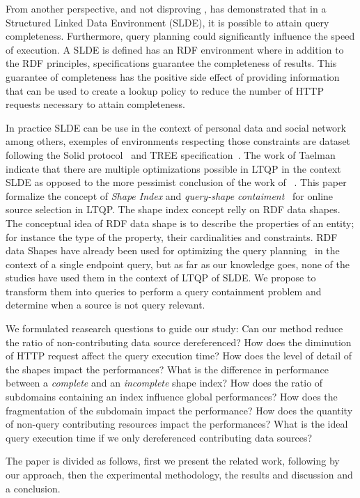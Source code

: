 From another perspective, and not disproving \citeauthor{hartig2016walking}, \citeauthor{Taelman2023} has demonstrated that in a Structured Linked Data Environment (SLDE),
it is possible to attain query completeness.
Furthermore, query planning could significantly influence the speed of execution.
A SLDE is defined has an RDF environment where in addition to the RDF principles, specifications
guarantee the completeness of results.
This guarantee of completeness has the positive side effect of providing information
that can be used to create a lookup policy to reduce the number of HTTP requests necessary to attain completeness.

In practice SLDE can be use in the context of personal data and social network among others,
exemples of environments respecting those constraints are dataset following the Solid protocol~\cite{Taelman2023} and TREE specification~\cite{tam_iswc_traversalsensortree_2024}.
The work of Taelman~\cite{Taelman2023} indicate that there are multiple optimizations possible in LTQP in the context SLDE as opposed to the
more pessimist conclusion of the work of ~\citeauthor{hartig2016walking}.
This paper formalize the concept of \emph{Shape Index} and \emph{query-shape contaiment}~\cite{tam2024opportunitiesshapebasedoptimizationlink} for online source selection in LTQP.
The shape index concept relly on RDF data shapes.
The conceptual idea of RDF data shape is to describe the properties of an entity;
for instance the type of the property, their cardinalities and constraints.
RDF data Shapes have already been used for optimizing the query planning~\cite{kashif2021}
in the context of a single endpoint query, but as far as our knowledge goes, none of the studies have used them in the context of LTQP of SLDE.
We propose to transform them into queries to perform a query containment problem and determine when a source is not query relevant.

We formulated reasearch questions to guide our study:
Can our method reduce the ratio of non-contributing data source dereferenced?
How does the diminution of HTTP request affect the query execution time?
How does the level of detail of the shapes impact the performances?
What is the difference in performance between a \emph{complete} and an \emph{incomplete} shape index?
How does the ratio of subdomains containing an index influence global performances?
How does the fragmentation of the subdomain impact the performance?
How does the quantity of non-query contributing resources impact the performances?
What is the ideal query execution time if we only dereferenced contributing data sources?

The paper is divided as follows, first we present the related work, following by our approach, then the
experimental methodology, the results and discussion and a conclusion.